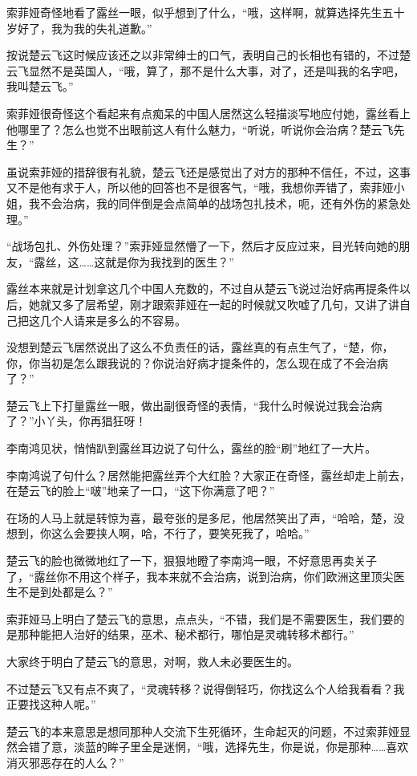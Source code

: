 索菲娅奇怪地看了露丝一眼，似乎想到了什么，“哦，这样啊，就算选择先生五十岁好了，我为我的失礼道歉。”

按说楚云飞这时候应该还之以非常绅士的口气，表明自己的长相也有错的，不过楚云飞显然不是英国人，“哦，算了，那不是什么大事，对了，还是叫我的名字吧，我叫楚云飞。”

索菲娅很奇怪这个看起来有点痴呆的中国人居然这么轻描淡写地应付她，露丝看上他哪里了？怎么也觉不出眼前这人有什么魅力，“听说，听说你会治病？楚云飞先生？”

虽说索菲娅的措辞很有礼貌，楚云飞还是感觉出了对方的那种不信任，不过，这事又不是他有求于人，所以他的回答也不是很客气，“哦，我想你弄错了，索菲娅小姐，我不会治病，我的同伴倒是会点简单的战场包扎技术，呃，还有外伤的紧急处理。”

“战场包扎、外伤处理？”索菲娅显然懵了一下，然后才反应过来，目光转向她的朋友，“露丝，这……这就是你为我找到的医生？”

露丝本来就是计划拿这几个中国人充数的，不过自从楚云飞说过治好病再提条件以后，她就又多了层希望，刚才跟索菲娅在一起的时候就又吹嘘了几句，又讲了讲自己把这几个人请来是多么的不容易。

没想到楚云飞居然说出了这么不负责任的话，露丝真的有点生气了，“楚，你，你，你当初是怎么跟我说的？你说治好病才提条件的，怎么现在成了不会治病了？”

楚云飞上下打量露丝一眼，做出副很奇怪的表情，“我什么时候说过我会治病了？”小丫头，你再猖狂呀！

李南鸿见状，悄悄趴到露丝耳边说了句什么，露丝的脸“刷”地红了一大片。

李南鸿说了句什么？居然能把露丝弄个大红脸？大家正在奇怪，露丝却走上前去，在楚云飞的脸上“啵”地亲了一口，“这下你满意了吧？”

在场的人马上就是转惊为喜，最夸张的是多尼，他居然笑出了声，“哈哈，楚，没想到，你这么会要挟人啊，哈，不行了，要笑死我了，哈哈。”

楚云飞的脸也微微地红了一下，狠狠地瞪了李南鸿一眼，不好意思再卖关子了，“露丝你不用这个样子，我本来就不会治病，说到治病，你们欧洲这里顶尖医生不是到处都是么？”

索菲娅马上明白了楚云飞的意思，点点头，“不错，我们是不需要医生，我们要的是那种能把人治好的结果，巫术、秘术都行，哪怕是灵魂转移术都行。”

大家终于明白了楚云飞的意思，对啊，救人未必要医生的。

不过楚云飞又有点不爽了，“灵魂转移？说得倒轻巧，你找这么个人给我看看？我正要找这种人呢。”

楚云飞的本来意思是想同那种人交流下生死循环，生命起灭的问题，不过索菲娅显然会错了意，淡蓝的眸子里全是迷惘，“哦，选择先生，你是说，你是那种……喜欢消灭邪恶存在的人么？”

